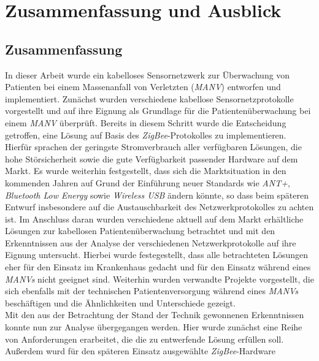 
\chapter{Zusammenfassung und Ausblick}\label{Ausblick}

\section{Zusammenfassung}
In dieser Arbeit wurde ein kabelloses Sensornetzwerk zur Überwachung von Patienten bei einem 
Massenanfall von Verletzten (\emph{MANV}) entworfen und implementiert. Zunächst wurden 
verschiedene kabellose Sensornetzprotokolle vorgestellt und auf ihre Eignung als Grundlage für
die Patientenüberwachung bei einem \emph{MANV} überprüft. Bereits in diesem Schritt wurde die Entscheidung
getroffen, eine Lösung auf Basis des \emph{ZigBee}-Protokolles zu implementieren. Hierfür sprachen
der geringste Stromverbrauch aller verfügbaren Lösungen, die hohe Störsicherheit sowie die
gute Verfügbarkeit passender Hardware auf dem Markt. Es wurde weiterhin festgestellt, dass sich die
Marktsituation in den kommenden Jahren auf Grund der Einführung neuer Standards wie \emph{ANT+},
\emph{Bluetooth Low Energy} sowie \emph{Wireless USB} ändern könnte, so dass beim späteren Entwurf
insbesondere auf die Austauschbarkeit des Netzwerkprotokolles zu achten ist. Im Anschluss daran wurden
verschiedene aktuell auf dem Markt erhältliche Lösungen zur kabellosen Patientenüberwachung betrachtet 
und mit den Erkenntnissen aus der Analyse der verschiedenen Netzwerkprotokolle auf ihre Eignung untersucht.
Hierbei wurde festegestellt, dass alle betrachteten Lösungen eher für den Einsatz im Krankenhaus
gedacht und für den Einsatz während eines \emph{MANVs} nicht geeignet sind. Weiterhin wurden verwandte
Projekte vorgestellt, die sich ebenfalls mit der technischen Patientenversorgung während eines \emph{MANVs} beschäftigen
und die Ähnlichkeiten und Unterschiede gezeigt.\\
Mit den aus der Betrachtung der Stand der Technik gewonnenen Erkenntnissen konnte nun zur Analyse 
übergegangen werden. Hier wurde zunächst eine Reihe von Anforderungen erarbeitet, die die zu entwerfende 
Lösung erfüllen soll. Außerdem wurd für den späteren Einsatz ausgewählte \emph{ZigBee}-Hardware 
